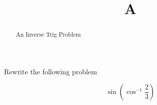 \documentclass{ximera}
\title[A]{A}
\begin{document}
\begin{abstract}
An Inverse Trig Problem
\end{abstract}

\maketitle

Rewrite the following problem

\[ \sin \left (\cos^{-1}  \frac{2}{3} \right)\]

\begin{question}
\begin{multipleChoice}
\end{multipleChoice}
\end{question}
\end{document}
